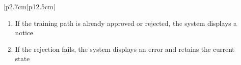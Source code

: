 \begin{table}[H]
\begin{tabular}{|p{2.7cm}|p{12.5cm}|}
\begin{minipage}[t]{\linewidth}
                                      \begin{enumerate}[topsep=0pt,itemsep=1pt,parsep=0pt,partopsep=0pt]
                                          \item If the training path is already approved or rejected, the system displays a
                                                notice
                                          \item If the rejection fails, the system displays an error and retains the current
                                                state
                                      \end{enumerate}
                                  \end{minipage} \\
        \hline
    \end{tabular}
    \label{tab:admin-reject-training-path}
\end{table}
